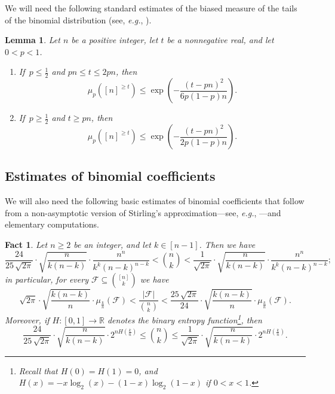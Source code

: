 \documentclass[10pt]{amsart}
\newtheorem{lem}[thm]{Lemma}
\newtheorem{fact}[thm]{Fact}
\theoremstyle{remark}
\newcommand{\rr}{\mathbb{R}}
\newcommand{\meg}{\geqslant}
\newcommand{\mik}{\leqslant}
\newcommand{\Fcal}{\mathcal{F}}
\begin{document}
We will need the following standard estimates of the biased measure of the tails of the
binomial distribution (see, \textit{e.g.}, \cite[Appendix A]{AS16}).
\begin{lem} \label{l2.3}
Let $n$ be a positive integer, let $t$ be a nonnegative real, and let\, $0<p<1$.
\begin{enumerate}
\item[(i)] If\, $p\mik \frac12 $ and $pn\mik t\mik 2pn$, then
\begin{equation} \label{e2.2}
\mu_p\left([n]^{\meg t}\right)
\mik \exp\left(-\frac{(t-pn)^2}{6p(1-p)n}\right).
\end{equation}
\item[(ii)] If\, $p\meg \frac12 $ and $t\meg pn$, then
\begin{equation} \label{e2.3}
\mu_p\left([n]^{\meg t}\right) \mik \exp\left(-\frac{(t-pn)^2}{2p(1-p)n}\right).
\end{equation}
\end{enumerate}
\end{lem}

\subsection{Estimates of binomial coefficients} \label{subsec2.5}

We will also need the following basic estimates of binomial coefficients that follow from a
non-asymptotic version of Stirling's approximation---see, \textit{e.g.}, \cite{Ro55}---and elementary computations.
\begin{fact} \label{f2.4}
Let $n\meg 2$ be an integer, and let $k\in [n-1]$. Then we have
\begin{equation} \label{e2.4}
\frac{24}{25 \, \sqrt{2\pi}} \cdot \sqrt{\frac{n}{k(n-k)}}\cdot \frac{n^n}{k^k(n-k)^{n-k}}<
\binom{n}{k}< \frac{1}{\sqrt{2\pi}}\cdot \sqrt{\frac{n}{k(n-k)}}\cdot \frac{n^n}{k^k(n-k)^{n-k}};
\end{equation}
in particular, for every $\Fcal\subseteq \binom{[n]}{k}$ we have
\begin{equation} \label{e2.5}
\sqrt{2\pi}\cdot \sqrt{\frac{k(n-k)}{n}} \cdot \mu_{\frac{k}{n}}(\Fcal) <
\frac{|\Fcal|}{\binom{n}{k}} < \frac{25 \, \sqrt{2\pi}}{24} \cdot \sqrt{\frac{k(n-k)}{n}}\cdot \mu_{\frac{k}{n}}(\Fcal).
\end{equation}
Moreover, if $H\colon [0,1]\to\rr$ denotes the binary entropy function\footnote{Recall that $H(0)=H(1)=0$,
and $H(x)=-x\log_2(x)-(1-x)\log_2(1-x)$ if $0<x<1$.}, then
\begin{equation} \label{e2.6}
\frac{24}{25 \, \sqrt{2\pi}} \cdot \sqrt{\frac{n}{k(n-k)}}\cdot 2^{nH(\frac{k}{n})} \mik \binom{n}{k} \mik
\frac{1}{\sqrt{2\pi}}\cdot \sqrt{\frac{n}{k(n-k)}}\cdot 2^{nH(\frac{k}{n})}.
\end{equation}
\end{fact}
\end{document}
